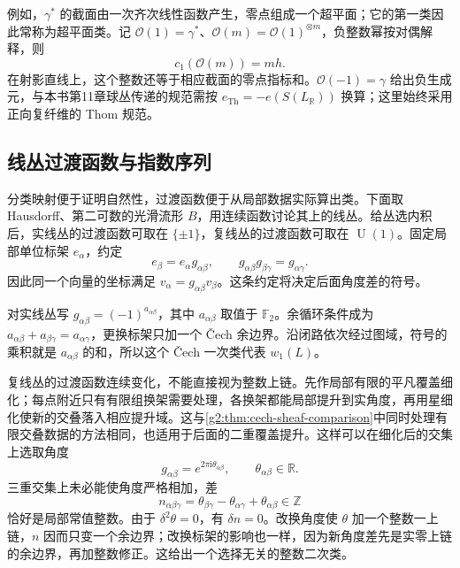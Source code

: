 例如，\(\gamma^*\) 的截面由一次齐次线性函数产生，零点组成一个超平面；它的第一类因此常称为超平面类。记 \(\mathcal O(1)=\gamma^*\)、\(\mathcal O(m)=\mathcal O(1)^{\otimes m}\)，负整数幂按对偶解释，则
\[
	c_1(\mathcal O(m))=m h.
\]
在射影直线上，这个整数还等于相应截面的零点指标和。\(\mathcal O(-1)=\gamma\) 给出负生成元，与本书第11章球丛传递的规范需按 \(e_{\mathrm{Th}}=-e(S(L_{\mathbb R}))\) 换算；这里始终采用正向复纤维的 Thom 规范。

\subsection{线丛过渡函数与指数序列}
\label{g2:subsec:2101:03}
分类映射便于证明自然性，过渡函数便于从局部数据实际算出类。下面取 Hausdorff、第二可数的光滑流形 \(B\)，用连续函数讨论其上的线丛。给丛选内积后，实线丛的过渡函数可取在 \(\{\pm1\}\)，复线丛的过渡函数可取在 \(\operatorname U(1)\)。固定局部单位标架 \(e_\alpha\)，约定
\begin{equation}\label{g2:eq:line-transition-convention}
	e_\beta=e_\alpha g_{\alpha\beta},\qquad
	g_{\alpha\beta}g_{\beta\gamma}=g_{\alpha\gamma}.
\end{equation}
因此同一个向量的坐标满足 \(v_\alpha=g_{\alpha\beta}v_\beta\)。这条约定将决定后面角度差的符号。

\ProseParagraphBreak

对实线丛写 \(g_{\alpha\beta}=(-1)^{a_{\alpha\beta}}\)，其中 \(a_{\alpha\beta}\) 取值于 \(\mathbb F_2\)。余循环条件成为 \(a_{\alpha\beta}+a_{\beta\gamma}=a_{\alpha\gamma}\)，更换标架只加一个 Čech 余边界。沿闭路依次经过图域，符号的乘积就是 \(a_{\alpha\beta}\) 的和，所以这个 Čech 一次类代表 \(w_1(L)\)。

复线丛的过渡函数连续变化，不能直接视为整数上链。先作局部有限的平凡覆盖细化；每点附近只有有限组换架需要处理，各换架都能局部提升到实角度，再用星细化使新的交叠落入相应提升域。这与\cref{g2:thm:cech-sheaf-comparison}中同时处理有限交叠数据的方法相同，也适用于后面的二重覆盖提升。这样可以在细化后的交集上选取角度
\[
	g_{\alpha\beta}=e^{2\pi\mathrm i\theta_{\alpha\beta}},\qquad \theta_{\alpha\beta}\in\mathbb R.
\]
三重交集上未必能使角度严格相加，差
\begin{equation}\label{g2:eq:chern-cech-integer-cocycle}
	n_{\alpha\beta\gamma}
	=\theta_{\beta\gamma}-\theta_{\alpha\gamma}+\theta_{\alpha\beta}
	\in\mathbb Z
\end{equation}
恰好是局部常值整数。由于 \(\delta^2\theta=0\)，有 \(\delta n=0\)。改换角度使 \(\theta\) 加一个整数一上链，\(n\) 因而只变一个余边界；改换标架的影响也一样，因为新角度差先是实零上链的余边界，再加整数修正。这给出一个选择无关的整数二次类。

